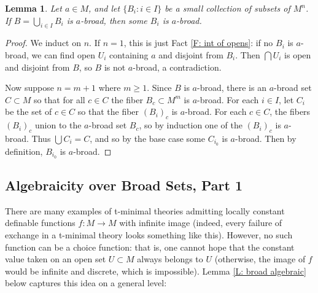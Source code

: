 \documentclass{amsart}
\newtheorem{lemma}[theorem]{Lemma}
\theoremstyle{definition}
\begin{document}
\begin{lemma}\label{L: broad union}
    Let $a\in M$, and let $\{B_i:i\in I\}$ be a small collection of subsets of $M^n$. If $B=\bigcup_{i\in I}B_i$ is $a$-broad, then some $B_i$ is $a$-broad. 
\end{lemma}
\begin{proof}
    We induct on $n$. If $n=1$, this is just Fact \ref{F: int of opens}: if no $B_i$ is $a$-broad, we can find open $U_i$ containing $a$ and disjoint from $B_i$. Then $\bigcap U_i$ is open and disjoint from $B$, so $B$ is not $a$-broad, a contradiction.
    
    Now suppose $n=m+1$ where $m\geq 1$. Since $B$ is $a$-broad, there is an $a$-broad set $C\subset M$ so that for all $c\in C$ the fiber $B_c\subset M^m$ is $a$-broad. For each $i\in I$, let $C_i$ be the set of $c\in C$ so that the fiber $(B_i)_c$ is $a$-broad. For each $c\in C$, the fibers $(B_i)_c$ union to the $a$-broad set $B_c$, so by induction one of the $(B_i)_c$ is $a$-broad. Thus $\bigcup C_i=C$, and so by the base case some $C_{i_0}$ is $a$-broad. Then by definition, $B_{i_0}$ is $a$-broad.
\end{proof}

\subsection{Algebraicity over Broad Sets, Part 1}

There are many examples of t-minimal theories admitting locally constant definable functions $f:M\rightarrow M$ with infinite image (indeed, every failure of exchange in a t-minimal theory looks something like this). However, no such function can be a choice function: that is, one cannot hope that the constant value taken on an open set $U\subset M$ always belongs to $U$ (otherwise, the image of $f$ would be infinite and discrete, which is impossible). Lemma \ref{L: broad algebraic} below captures this idea on a general level:
\end{document}
